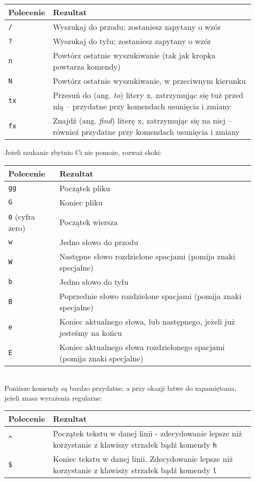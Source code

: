 \documentclass[a4paper,12pt]{article}
\begin{document}
\begin{tabular}{ l | p{} }
{\bf Polecenie} & {\bf Rezultat} \\ \hline
{\tt /} & Wyszukaj do przodu; zostaniesz zapytany o wzór \\
{\tt ?} & Wyszukaj do tyłu; zostaniesz zapytany o wzór \\
{\tt n} & Powtórz ostatnie wyszukiwanie (tak jak kropka powtarza komendy) \\
{\tt N} & Powtórz ostatnie wyszukiwanie, w przeciwnym kierunku \\
{\tt tx} & Przesuń do (ang. {\it to}) litery x, zatrzymując się tuż przed nią -- przydatne przy komendach usunięcia i zmiany \\
{\tt fx} & Znajdź (ang. {\it find}) literę x, zatrzymując się na niej -- również przydatne przy komendach usunięcia i zmiany \\ \hline
\end{tabular}\newpage

\noindent
Jeżeli szukanie zbytnio Ci nie pomoże, rozważ skoki:

\begin{tabular}{ l | p{} }
{\bf Polecenie} & {\bf Rezultat} \\ \hline
{\tt gg} & Początek pliku \\
{\tt G} & Koniec pliku \\
{\tt 0} (cyfra zero) & Początek wiersza \\
{\tt w} & Jedno słowo do przodu \\
{\tt W} & Następne słowo rozdzielone spacjami (pomija znaki specjalne) \\
{\tt b} & Jedno słowo do tyłu \\
{\tt B} & Poprzednie słowo rozdzielone spacjami (pomija znaki specjalne) \\
{\tt e} & Koniec aktualnego słowa, lub następnego, jeżeli już jesteśmy na końcu \\
{\tt E} & Koniec aktualnego słowa rozdzielonego spacjami (pomija znaki specjalne) \\ \hline
\end{tabular}\\

\noindent
Poniższe komendy są bardzo przydatne, a przy okazji łatwe do zapamiętania, jeżeli znasz wyrażenia regularne:

\begin{tabular}{ l | p{} }
{\bf Polecenie} & {\bf Rezultat} \\ \hline
{\tt \^{}} & Początek tekstu w danej linii -  zdecydowanie lepsze niż korzystanie z klawiszy strzałek bądź komendy {\tt h} \\
{\tt \$} & Koniec tekstu w danej linii. Zdecydowanie lepsze niż korzystanie z klawiszy strzałek bądź komendy {\tt l} \\ \hline
\end{tabular}\\
\end{document}
